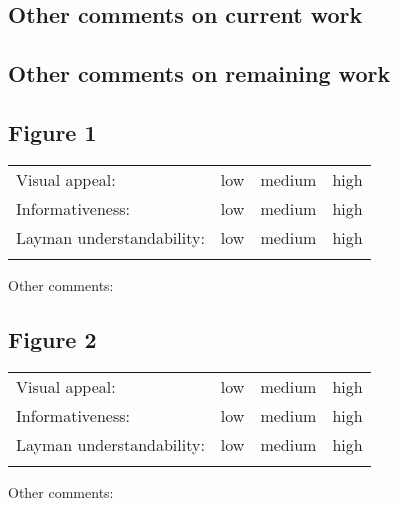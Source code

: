 \documentclass[10pt]{article}
\theoremstyle{definition}
\begin{document}
\subsection*{Other comments on current work}
\vspace{1in}

\subsection*{Other comments on remaining work}
\vspace{1in}

\newpage

\subsection*{Figure 1}

\def\arraystretch{1.5}
\begin{tabular}{lccc}
    Visual appeal: & low & medium & high \\
    Informativeness: & low & medium & high \\
    Layman understandability: & low & medium & high \\
    \hspace{2in} &
    \hspace{1in} &
    \hspace{1in} &
    \hspace{1in}
\end{tabular}

\noindent
Other comments:
\vspace{1.5in}

\subsection*{Figure 2}

\def\arraystretch{1.5}
\begin{tabular}{lccc}
    Visual appeal: & low & medium & high \\
    Informativeness: & low & medium & high \\
    Layman understandability: & low & medium & high \\
    \hspace{2in} &
    \hspace{1in} &
    \hspace{1in} &
    \hspace{1in}
\end{tabular}

\noindent
Other comments:
\vspace{1.5in}
\end{document}
